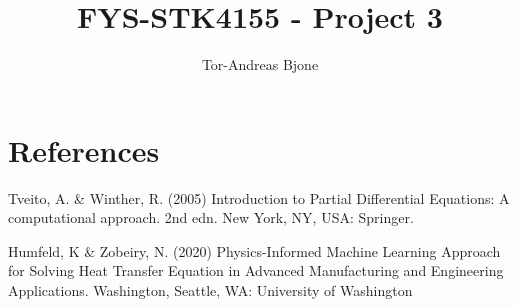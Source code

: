 \documentclass[a4paper,10pt,english]{article}
\title{FYS-STK4155 - Project 3}
\author{Tor-Andreas Bjone}
\begin{document}
\maketitle
\tableofcontents








\section*{References}  
\begin{itemize}
 Tveito, A. \& Winther, R. (2005) Introduction to Partial Differential Equations: A computational approach. 2nd edn. New York, NY, USA: Springer.

 Humfeld, K \& Zobeiry, N. (2020)  Physics-Informed Machine Learning Approach for Solving Heat Transfer Equation
    in Advanced Manufacturing and Engineering Applications. Washington, Seattle, WA: University of Washington
\end{itemize}
\end{document}
